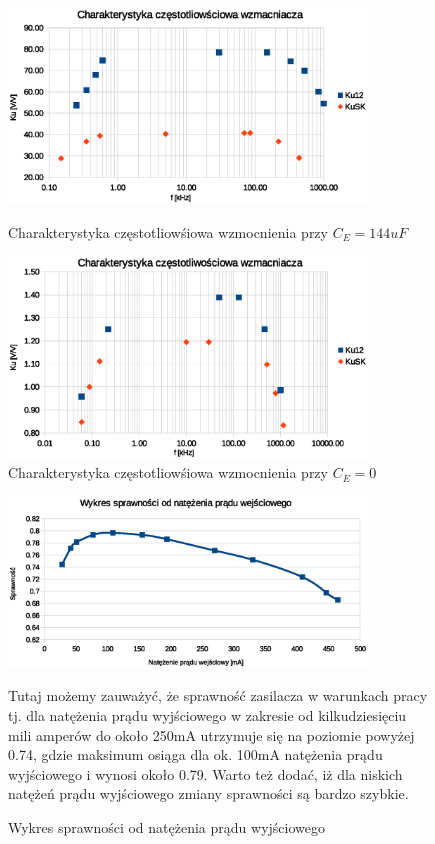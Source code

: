 \documentclass[a4paper,12pt]{article}
\begin{document}
\begin{figure}[h!]
  \begin{center}
  \includegraphics[width=0.85\textwidth]{g1.eps}
  \caption{Charakterystyka częstotliowśiowa wzmocnienia przy $C_E = 144uF$}
  \end{center}



  \begin{center}
  \includegraphics[width=0.85\textwidth]{g2.eps}
  \caption{Charakterystyka częstotliowśiowa wzmocnienia przy $C_E = 0$}
  \end{center}


\end{figure}

\pagebreak

\begin{figure}[h!]
  \begin{center}
  \includegraphics[width=0.85\textwidth]{spr_Iwy.eps}
  \caption{Wykres sprawności od natężenia prądu wyjściowego}
  \end{center}
  
  Tutaj możemy zauważyć, że sprawność zasilacza w warunkach pracy tj. dla natężenia prądu wyjściowego w zakresie od
kilkudziesięciu mili amperów do około 250mA utrzymuje się na poziomie powyżej 0.74, gdzie maksimum osiąga 
dla ok. 100mA natężenia prądu wyjściowego i wynosi około 0.79.
Warto też dodać, iż dla niskich natężeń prądu wyjściowego zmiany sprawności są bardzo szybkie.
\end{figure}
\end{document}
